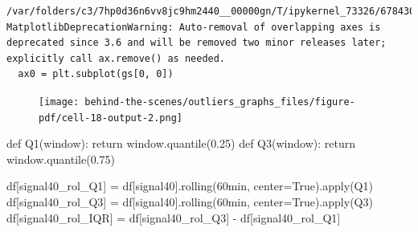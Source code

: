 \documentclass[
  letterpaper,
  DIV=11,
  numbers=noendperiod,
  oneside]{scrreprt}
\newenvironment{Shaded}{\begin{snugshade}}{\end{snugshade}}
\newcommand{\BuiltInTok}[1]{\textcolor[rgb]{0.00,0.23,0.31}{#1}}
\newcommand{\ControlFlowTok}[1]{\textcolor[rgb]{0.00,0.23,0.31}{#1}}
\newcommand{\FloatTok}[1]{\textcolor[rgb]{0.68,0.00,0.00}{#1}}
\newcommand{\KeywordTok}[1]{\textcolor[rgb]{0.00,0.23,0.31}{#1}}
\newcommand{\NormalTok}[1]{\textcolor[rgb]{0.00,0.23,0.31}{#1}}
\newcommand{\OperatorTok}[1]{\textcolor[rgb]{0.37,0.37,0.37}{#1}}
\newcommand{\StringTok}[1]{\textcolor[rgb]{0.13,0.47,0.30}{#1}}
\newcommand{\VariableTok}[1]{\textcolor[rgb]{0.07,0.07,0.07}{#1}}
\begin{document}
\begin{verbatim}
/var/folders/c3/7hp0d36n6vv8jc9hm2440__00000gn/T/ipykernel_73326/678430211.py:6: MatplotlibDeprecationWarning: Auto-removal of overlapping axes is deprecated since 3.6 and will be removed two minor releases later; explicitly call ax.remove() as needed.
  ax0 = plt.subplot(gs[0, 0])
\end{verbatim}

\begin{figure}[H]

{\centering \texttt{[image: behind-the-scenes/outliers\_graphs\_files/figure-pdf/cell-18-output-2.png]}

}

\end{figure}

\begin{Shaded}
\begin{Highlighting}[]
\KeywordTok{def}\NormalTok{ Q1(window):}
    \ControlFlowTok{return}\NormalTok{ window.quantile(}\FloatTok{0.25}\NormalTok{)}
\KeywordTok{def}\NormalTok{ Q3(window):}
    \ControlFlowTok{return}\NormalTok{ window.quantile(}\FloatTok{0.75}\NormalTok{)}
\end{Highlighting}
\end{Shaded}

\begin{Shaded}
\begin{Highlighting}[]
\NormalTok{df[}\StringTok{\textquotesingle{}signal40\_rol\_Q1\textquotesingle{}}\NormalTok{] }\OperatorTok{=}\NormalTok{ df[}\StringTok{\textquotesingle{}signal40\textquotesingle{}}\NormalTok{].rolling(}\StringTok{\textquotesingle{}60min\textquotesingle{}}\NormalTok{, center}\OperatorTok{=}\VariableTok{True}\NormalTok{).}\BuiltInTok{apply}\NormalTok{(Q1)}
\NormalTok{df[}\StringTok{\textquotesingle{}signal40\_rol\_Q3\textquotesingle{}}\NormalTok{] }\OperatorTok{=}\NormalTok{ df[}\StringTok{\textquotesingle{}signal40\textquotesingle{}}\NormalTok{].rolling(}\StringTok{\textquotesingle{}60min\textquotesingle{}}\NormalTok{, center}\OperatorTok{=}\VariableTok{True}\NormalTok{).}\BuiltInTok{apply}\NormalTok{(Q3)}
\NormalTok{df[}\StringTok{\textquotesingle{}signal40\_rol\_IQR\textquotesingle{}}\NormalTok{] }\OperatorTok{=}\NormalTok{ df[}\StringTok{\textquotesingle{}signal40\_rol\_Q3\textquotesingle{}}\NormalTok{] }\OperatorTok{{-}}\NormalTok{ df[}\StringTok{\textquotesingle{}signal40\_rol\_Q1\textquotesingle{}}\NormalTok{]}
\end{Highlighting}
\end{Shaded}
\end{document}
